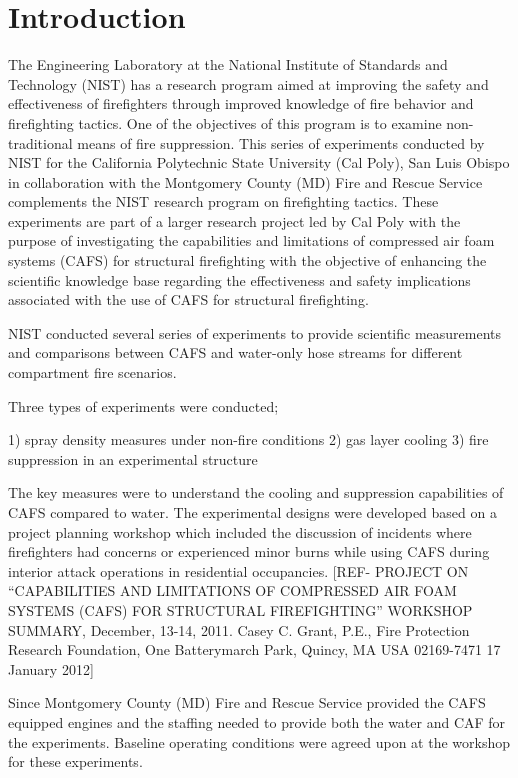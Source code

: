 \documentclass[12pt,oneside]{book}
\begin{document}
\chapter{Introduction}
\label{chap:Introduction}
     
The Engineering Laboratory at the National Institute of Standards and Technology (NIST) has a research program aimed at improving the safety and effectiveness of firefighters through improved knowledge of fire behavior and firefighting tactics.  One of the objectives of this program is to examine non-traditional means of fire suppression.   This series of experiments conducted by NIST for the California Polytechnic State University (Cal Poly), San Luis Obispo in collaboration with the Montgomery County (MD) Fire and Rescue Service complements the NIST research program on firefighting tactics.  These experiments are part of a larger research project led by Cal Poly with the purpose of investigating the capabilities and limitations of compressed air foam systems (CAFS) for structural firefighting with the objective of enhancing the scientific knowledge base regarding the effectiveness and safety implications associated with the use of CAFS for structural firefighting.
  
NIST conducted several series of experiments to provide scientific measurements and comparisons between CAFS and water-only hose streams for different compartment fire scenarios.  

Three types of experiments were conducted; 

1)            spray density measures under non-fire conditions 
2)            gas layer cooling 
3)            fire suppression in an experimental structure

The key measures were to understand the cooling and suppression capabilities of CAFS compared to water.   The experimental designs were developed based on a project planning workshop which included the discussion of incidents where firefighters had concerns or experienced minor burns while using CAFS during interior attack operations in residential occupancies.  [REF-  PROJECT ON “CAPABILITIES AND LIMITATIONS OF COMPRESSED AIR FOAM SYSTEMS (CAFS) FOR STRUCTURAL FIREFIGHTING” WORKSHOP SUMMARY, December, 13-14, 2011.   Casey C. Grant, P.E., Fire Protection Research Foundation, One Batterymarch Park, Quincy, MA USA 02169-7471
17 January 2012]

Since Montgomery County (MD) Fire and Rescue Service provided the CAFS equipped engines and the staffing needed to provide both the water and CAF for the experiments.  Baseline operating conditions were agreed upon at the workshop for these experiments. 
\end{document}
